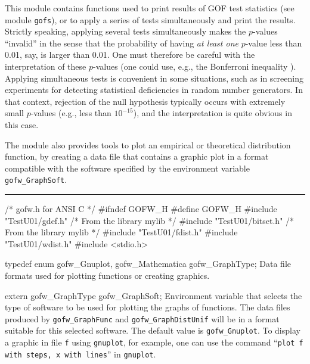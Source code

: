 
This module contains functions used to print results of GOF
test statistics (see module {\tt gofs}), or to apply a series of tests
simultaneously and print the results.
Strictly speaking, applying several tests simultaneously makes the 
$p$-values ``invalid'' in the sense that the probability of having 
{\em at least one\/} $p$-value less than 0.01, say, is larger than 0.01.
One must therefore be careful with the interpretation of these 
$p$-values (one could use, e.g., the Bonferroni inequality \cite{sLAW00a}).
Applying simultaneous tests is convenient in some situations, such as in 
screening experiments for detecting statistical deficiencies 
in random number generators.  In that context, rejection of the null
hypothesis typically occurs with extremely small $p$-values (e.g., less
than $10^{-15}$), and the interpretation is quite obvious in this case.


The module also provides tools to plot an empirical or
theoretical distribution function, by creating a data file that
contains a graphic plot in a format compatible with the software
specified by the environment variable {\tt gofw\_GraphSoft}.


\bigskip\hrule\medskip
\code\hide
/* gofw.h for ANSI C */
#ifndef GOFW_H
#define GOFW_H
\endhide
#include "TestU01/gdef.h"           /* From the library mylib */
#include "TestU01/bitset.h"         /* From the library mylib */
#include "TestU01/fdist.h"
#include "TestU01/wdist.h"
#include <stdio.h>
\endcode


\code

typedef enum {
   gofw_Gnuplot,
   gofw_Mathematica
   } gofw_GraphType;
\endcode
 \tab  Data file formats used for plotting functions or creating graphics.
 \endtab
\code


extern gofw_GraphType gofw_GraphSoft;
\endcode
 \tab Environment variable that selects the type of software to be 
   used for plotting the graphs of functions.
   The data files produced by {\tt gofw\_GraphFunc} and 
   {\tt gofw\_GraphDistUnif} will be in a format suitable 
   for this selected software.
   The default value is {\tt gofw\_Gnuplot}.
   To display a graphic in file {\tt f} using {\tt gnuplot}, for example,
   one can use the command ``{\tt plot f with steps, x with lines}''
   in {\tt gnuplot}.
 \endtab
\code


